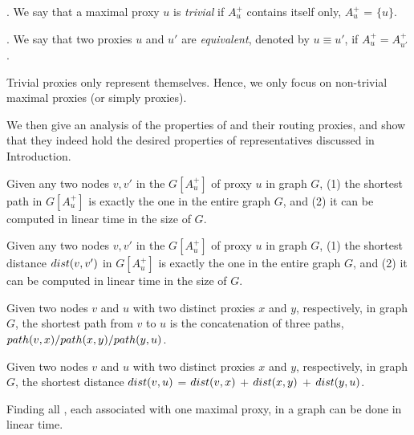 . We say that a maximal proxy $u$ is {\em trivial} if $A^+_u$ contains itself only, \ie $A^+_{u}$ = $\{u\}$.


. We say that two proxies $u$ and $u'$ are {\em equivalent}, denoted by $u\equiv u'$, if $A^+_{u} = A^+_{u'}$.


 Trivial proxies only represent themselves. Hence, we only focus on non-trivial maximal proxies (or simply proxies).

We then give an analysis of the properties of  \dras and their routing proxies, and show that they indeed hold the desired properties of representatives discussed in Introduction.




\begin{prop}
\label{pro-proxy-path} Given any two nodes $v, v'$ in the \dra $G[A^+_u]$ of proxy $u$ in graph $G$,
(1) the shortest path in $G[A^+_u]$ is exactly the one in the entire graph $G$, and
(2) it can be computed in linear time in the size of $G$.
\end{prop}


\begin{cor}
\label{cor-proxy-distance} Given any two nodes $v, v'$ in the \dra $G[A^+_u]$ of proxy $u$ in graph $G$,
(1) the shortest distance $\dist(v, v')$ in $G[A^+_u]$ is exactly the one in the entire graph $G$, and
(2) it can be computed in linear time in the size of $G$.
\end{cor}


\begin{prop}
\label{pro-proxy-path-global} Given two nodes $v$ and $u$ with two distinct proxies $x$ and $y$, respectively, in graph $G$, the shortest path from $v$ to $u$ is the concatenation of three paths, \ie $\path(v, x)/\path(x, y)/\path(y, u)$.
\end{prop}

\vspace{1ex}
\begin{cor}
\label{cor-proxy-distance-global} Given two nodes $v$ and $u$ with two distinct proxies $x$ and $y$, respectively, in graph $G$, the shortest distance $\dist(v, u)$ = $\dist(v, x)$ $+$ $\dist(x, y)$  $+$ $\dist(y, u)$.
\end{cor}

\vspace{1ex}
\begin{theorem}
\label{thm-compute-dras} Finding all \dras, each associated with one maximal proxy, in a graph can be done in linear time.
\end{theorem}






